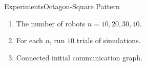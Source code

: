 \begin{frame}{Experiments}{Octagon-Square Pattern}
  \small{
    \begin{enumerate}
    \item The number of robots $n=10,20,30,40$.
    \item For each $n$, run $10$ trials of simulations.
    \item Connected initial communication graph.
    \end{enumerate}
  }
\end{frame}